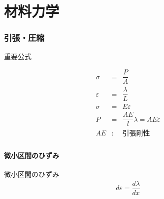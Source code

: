 \documentclass[a4paper]{jsarticle}
\begin{document}
\part{材料力学}
\section{引張・圧縮}
\begin{itembox}[l]{重要公式}
    \begin{center}
        \begin{eqnarray*}
            \sigma&=&\dfrac{P}{A}\\
            \varepsilon&=&\dfrac{\lambda}{L}\\
            \sigma&=&E\varepsilon\\
            P&=&\dfrac{AE}{l}\lambda=AE\varepsilon\\
            AE&:&引張剛性\\
        \end{eqnarray*}
    \end{center}
\end{itembox}
\subsection{微小区間のひずみ}
\begin{itembox}[l]{微小区間のひずみ}
    \begin{eqnarray*}
        d\varepsilon=\dfrac{d\lambda}{dx}\\
    \end{eqnarray*}
\end{itembox}
\end{document}

